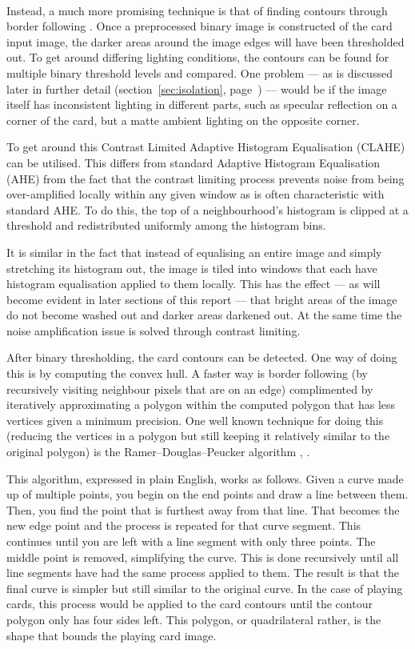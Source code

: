 \documentclass[a4paper,12pt,notitlepage]{article}
\newcommand{\secref}[1]{(section~\ref{#1}, page~\pageref{#1})}
\begin{document}
			~\\

			Instead, a much more promising technique is that of finding contours through border following \autocite{suzuki1985topological}. Once a preprocessed binary image is constructed of the card input image, the darker areas around the image edges will have been thresholded out. To get around differing lighting conditions, the contours can be found for multiple binary threshold levels and compared. One problem --- as is discussed later in further detail \secref{sec:isolation} --- would be if the image itself has inconsistent lighting in different parts, such as specular reflection on a corner of the card, but a matte ambient lighting on the opposite corner.

			To get around this Contrast Limited Adaptive Histogram Equalisation (CLAHE) \autocite{pizer1987adaptive} can be utilised. This differs from standard Adaptive Histogram Equalisation (AHE) from the fact that the contrast limiting process prevents noise from being over-amplified locally within any given window as is often characteristic with standard AHE. To do this, the top of a neighbourhood's histogram is clipped at a threshold and redistributed uniformly among the histogram bins.

			It is similar in the fact that instead of equalising an entire image and simply stretching its histogram out, the image is tiled into windows that each have histogram equalisation applied to them locally. This has the effect --- as will become evident in later sections of this report --- that bright areas of the image do not become washed out and darker areas darkened out. At the same time the noise amplification issue is solved through contrast limiting.

			After binary thresholding, the card contours can be detected. One way of doing this is by computing the convex hull. A faster way is border following (by recursively visiting neighbour pixels that are on an edge) complimented by iteratively approximating a polygon within the computed polygon that has less vertices given a minimum precision. One well known technique for doing this (reducing the vertices in a polygon but still keeping it relatively similar to the original polygon) is the Ramer–Douglas–Peucker algorithm \autocite{ramer1972iterative}, \autocite{douglas1973algorithms}.

			This algorithm, expressed in plain English, works as follows. Given a curve made up of multiple points, you begin on the end points and draw a line between them. Then, you find the point that is furthest away from that line. That becomes the new edge point and the process is repeated for that curve segment. This continues until you are left with a line segment with only three points. The middle point is removed, simplifying the curve. This is done recursively until all line segments have had the same process applied to them. The result is that the final curve is simpler but still similar to the original curve. In the case of playing cards, this process would be applied to the card contours until the contour polygon only has four sides left. This polygon, or quadrilateral rather, is the shape that bounds the playing card image.
\end{document}
